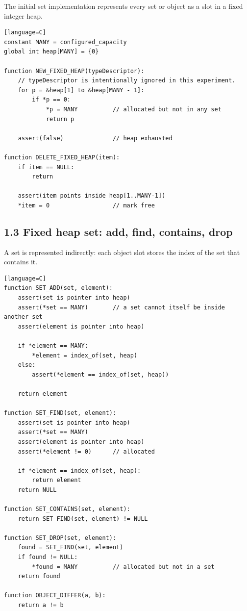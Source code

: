 \documentclass[11pt]{article}
\begin{document}
The initial set implementation represents every set or object as a slot
in a fixed integer heap.

\begin{verbatim}[language=C]
constant MANY = configured_capacity
global int heap[MANY] = {0}

function NEW_FIXED_HEAP(typeDescriptor):
    // typeDescriptor is intentionally ignored in this experiment.
    for p = &heap[1] to &heap[MANY - 1]:
        if *p == 0:
            *p = MANY          // allocated but not in any set
            return p

    assert(false)              // heap exhausted

function DELETE_FIXED_HEAP(item):
    if item == NULL:
        return

    assert(item points inside heap[1..MANY-1])
    *item = 0                  // mark free
\end{verbatim}

\subsection{1.3 Fixed heap set: add, find, contains,
drop}\label{fixed-heap-set-add-find-contains-drop}

A set is represented indirectly: each object slot stores the index of
the set that contains it.

\begin{verbatim}[language=C]
function SET_ADD(set, element):
    assert(set is pointer into heap)
    assert(*set == MANY)       // a set cannot itself be inside another set
    assert(element is pointer into heap)

    if *element == MANY:
        *element = index_of(set, heap)
    else:
        assert(*element == index_of(set, heap))

    return element

function SET_FIND(set, element):
    assert(set is pointer into heap)
    assert(*set == MANY)
    assert(element is pointer into heap)
    assert(*element != 0)      // allocated

    if *element == index_of(set, heap):
        return element
    return NULL

function SET_CONTAINS(set, element):
    return SET_FIND(set, element) != NULL

function SET_DROP(set, element):
    found = SET_FIND(set, element)
    if found != NULL:
        *found = MANY          // allocated but not in a set
    return found

function OBJECT_DIFFER(a, b):
    return a != b
\end{verbatim}
\end{document}
